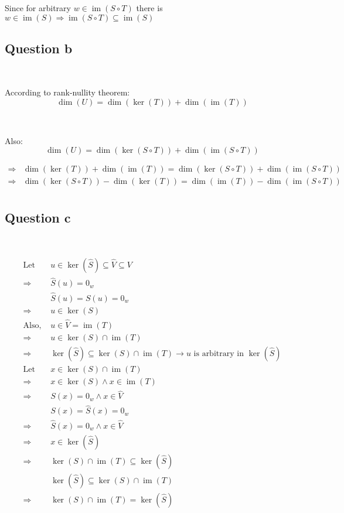 \documentclass{article}
\DeclareMathOperator{\im}{im}
\begin{document}
Since for arbitrary $w\in \im (S\circ T)$ there is $w\in \im(S) \Rightarrow \im(S\circ T) \subseteq \im(S)$

\subsection{Question b}

~

According to rank-nullity theorem:
$$
\dim(U)=\dim(\ker(T))+\dim(\im(T))
$$

~

Also:
$$
\dim(U)=\dim(\ker(S\circ T))+\dim(\im(S\circ T))
$$

\begin{equation*}
\begin{split}
\Rightarrow &\dim(\ker(T))+\dim(\im(T))=\dim(\ker(S\circ T))+\dim(\im(S\circ T))\\
\Rightarrow &\dim(\ker(S\circ T))-\dim(\ker(T))=\dim(\im(T))-\dim(\im(S\circ T))\\
\end{split}
\end{equation*}

\subsection{Question c}

~

\begin{equation*}
\tag{conclusion 1}
\begin{split}
\text{Let } &u\in \ker(\hat{S}) \subseteq \hat{V} \subseteq V\\
\Rightarrow & \hat{S}(u)=0_w\\
& \hat{S}(u) =S(u)=0_w\\
\Rightarrow &u\in\ker(S)\\
\text{Also, }&u\in\hat{V}=\im(T)\\
\Rightarrow &u\in \ker(S)\cap\im(T)\\
\Rightarrow &\ker(\hat{S}) \subseteq \ker(S)\cap\im(T) \rightarrow u\text{ is arbitrary in } \ker(\hat{S})\\
\text{Let } & x\in \ker(S)\cap\im(T)\\
\Rightarrow  & x \in \ker(S)\land x\in\im(T)\\
\Rightarrow &S(x)=0_w\land x\in \hat{V}\\
&S(x)=\hat{S}(x)=0_w\\
\Rightarrow &\hat{S}(x)=0_w\land x\in\hat{V}\\
\Rightarrow &x\in\ker(\hat{S})\\
\Rightarrow &\ker(S)\cap\im(T)\subseteq\ker(\hat{S})\\
&\ker(\hat{S}) \subseteq \ker(S)\cap\im(T)\\
\Rightarrow &\ker(S)\cap\im(T)=\ker(\hat{S})
\end{split}
\end{equation*}
\end{document}
